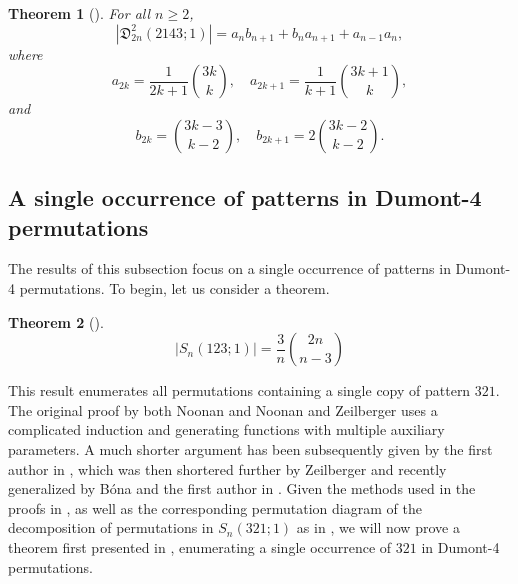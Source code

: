 \documentclass[
final
]{dmtcs-episciences}
\newtheorem{theorem}{Theorem}[section]%
\theoremstyle{definition}
\theoremstyle{remark}
\begin{document}
\begin{theorem}[\cite{Burstein_Ofodile}]
For all $n \ge 2$,
\[
|\mathfrak{D}^2_{2n} (2143;1)| = a_n b_{n+1} + b_n a_{n+1} + a_{n-1}a_n,
\]
where
\[
a_{2k} = \frac{1}{2k+1} \binom{3k}{k}, \quad a_{2k+1} = \frac{1}{k+1} \binom{3k+1}{k},
\]
and
\[
b_{2k} = \binom{3k-3}{k-2}, \quad b_{2k+1} = 2 \binom {3k-2}{k-2}.
\]
\end{theorem}

\subsection {A single occurrence of patterns in Dumont-4 permutations}

The results of this subsection focus on a single occurrence of patterns in Dumont-4 permutations.  To begin, let us consider a theorem.

\begin{theorem}[\cite {Noonan, Noonan_Zeilberger}] \label{Noo_Zeil}
\[
|S_n(123;1)| = \frac{3}{n} \binom{2n}{n-3}
\]
\end{theorem}
%
% 
This result enumerates all permutations containing a single copy of pattern $321$. The original proof by both Noonan \cite {Noonan} and Noonan and Zeilberger \cite {Noonan_Zeilberger} uses a complicated induction and generating functions with multiple auxiliary parameters. A much shorter argument has been subsequently given by the first author in \cite{Burstein_Short}, which was then shortered further by Zeilberger \cite{Zeilberger_lovely} and recently generalized by B\'ona and the first author in \cite{Bona_Burstein}.  
Given the methods used in the proofs in \cite{Burstein_Short, Zeilberger_lovely}, as well as the corresponding permutation diagram of the decomposition of permutations in $S_n(321;1)$ as in \cite{Burstein_Short}, we will now prove a theorem first presented in \cite{Burstein_Jones}, enumerating a single occurrence of $321$ in Dumont-4 permutations.
\end{document}
